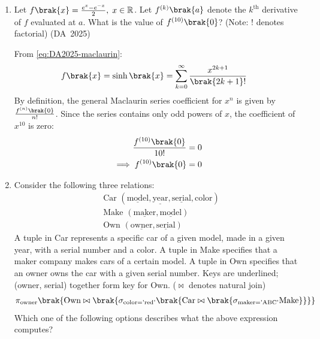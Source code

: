 \begin{enumerate}[label=\thesubsection.\arabic*, ref=\thesubsection.\theenumi]
\item 
Let $f\brak{x} = \frac{e^x - e^{-x}}{2}, \; x \in \mathbb{R}$. Let $f^{(k)}\brak{a}$ denote the $k^{\text{th}}$ derivative of $f$ evaluated at $a$. What is the value of $f^{(10)}\brak{0}$? (Note: ! denotes factorial)
\hfill (DA~2025)
\begin{enumerate}
	\begin{multicols}{4}
		\item $0$
		\item $1$
		\item $\frac{1}{10!}$
		\item $\frac{2}{10!}$
	\end{multicols}
\end{enumerate}
\solution
From \eqref{eq:DA2025-maclaurin}:
\begin{align}
	f\brak{x} &= \sinh\brak{x} = \sum_{k=0}^{\infty} \frac{x^{2k+1}}{\brak{2k+1}!}
\end{align}
By definition, the general Maclaurin series coefficient for $x^n$ is given by $\frac{f^{(n)}\brak{0}}{n!}$. Since the series contains only odd powers of $x$, the coefficient of $x^{10}$ is zero:
\begin{align}
	\frac{f^{(10)}\brak{0}}{10!} &= 0
	\\
	\implies f^{(10)}\brak{0} &= 0
\end{align}
	\item 
	Consider the following three relations:
	\begin{align*}
		&\text{Car } (\underline{\text{model}}, \underline{\text{year}}, \underline{\text{serial}}, \text{color}) \\
		&\text{Make } (\underline{\text{maker}}, \underline{\text{model}}) \\
		&\text{Own } (\underline{\text{owner}}, \underline{\text{serial}})
	\end{align*}
	A tuple in Car represents a specific car of a given model, made in a given year, with a serial number and a color. A tuple in Make specifies that a maker company makes cars of a certain model. A tuple in Own specifies that an owner owns the car with a given serial number. Keys are underlined; (owner, serial) together form key for Own. ($\bowtie$ denotes natural join)
	\begin{align}
		\pi_{\text{owner}}\brak{\text{Own} \bowtie \brak{\sigma_{\text{color} = \text{'red'}}\brak{\text{Car} \bowtie \brak{\sigma_{\text{maker} = \text{'ABC'}}\text{Make}}}}}
	\end{align}
	Which one of the following options describes what the above expression computes?

\end{enumerate}
